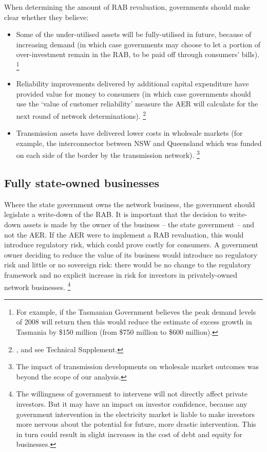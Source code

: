\documentclass[FrontPage]{grattan}
\begin{document}
When determining the amount of RAB revaluation, governments should make clear whether they believe:
\begin{itemize}
 \item Some of the under-utilised assets will be fully-utilised in future, because of increasing demand (in which case governments may choose to let a portion of over-investment remain in the RAB, to be paid off through consumers' bills).%
 \footnote{For example, if the Tasmanian Government believes the peak demand levels of 2008 will return then this would reduce the estimate of excess growth in Tasmania by \$150 million (from \$750 million to \$600 million).}
 \item Reliability improvements delivered by additional capital expenditure have provided value for money to consumers (in which case governments should use the `value of customer reliability' measure the AER will calculate for the next round of network determinations).%
 \footnote{\textcite{Frydenberg2017RuleChangeProposalVCR}, and see Technical Supplement.}
 \item Transmission assets have delivered lower costs in wholesale markets (for example, the interconnector between NSW and Queensland which was funded on each side of the border by the transmission network).%
 \footnote{The impact of transmission developments on wholesale market outcomes was beyond the scope of our analysis.}
\end{itemize}


\subsection{Fully state-owned businesses}
Where the state government owns the network business, the government should legislate a write-down of the RAB\@. It is important that the decision to write-down assets is made by the owner of the business -- the state government -- and not the AER\@. If the AER were to implement a RAB revaluation, this would introduce regulatory risk, which could prove costly for consumers. A government owner deciding to reduce the value of its business would introduce no regulatory risk and little or no sovereign risk: there would be no change to the regulatory framework and no explicit increase in risk for investors in privately-owned network businesses.%
\footnote{The willingness of government to intervene will not directly affect private investors. But it may have an impact on investor confidence, because any government intervention in the electricity market is liable to make investors more nervous about the potential for future, more drastic intervention. This in turn could result in slight increases in the cost of debt and equity for businesses.} 
\end{document}

